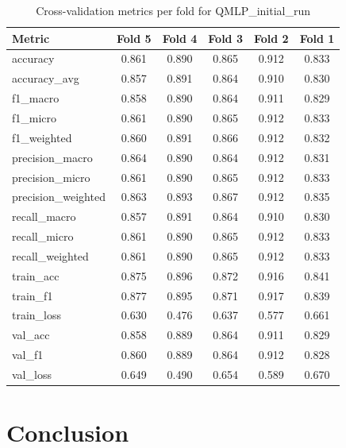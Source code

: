 \documentclass[runningheads]{llncs}
\begin{document}
\begin{table}[t]
\centering
\caption{Cross-validation metrics per fold for QMLP\_initial\_run}\label{tab3}
\begin{tabular}{|l|c|c|c|c|c|}
\hline
Metric & Fold 5 & Fold 4 & Fold 3 & Fold 2 & Fold 1 \\
\hline
accuracy & 0.861 & 0.890 & 0.865 & 0.912 & 0.833 \\
accuracy\_avg & 0.857 & 0.891 & 0.864 & 0.910 & 0.830 \\
f1\_macro & 0.858 & 0.890 & 0.864 & 0.911 & 0.829 \\
f1\_micro & 0.861 & 0.890 & 0.865 & 0.912 & 0.833 \\
f1\_weighted & 0.860 & 0.891 & 0.866 & 0.912 & 0.832 \\
precision\_macro & 0.864 & 0.890 & 0.864 & 0.912 & 0.831 \\
precision\_micro & 0.861 & 0.890 & 0.865 & 0.912 & 0.833 \\
precision\_weighted & 0.863 & 0.893 & 0.867 & 0.912 & 0.835 \\
recall\_macro & 0.857 & 0.891 & 0.864 & 0.910 & 0.830 \\
recall\_micro & 0.861 & 0.890 & 0.865 & 0.912 & 0.833 \\
recall\_weighted & 0.861 & 0.890 & 0.865 & 0.912 & 0.833 \\
train\_acc & 0.875 & 0.896 & 0.872 & 0.916 & 0.841 \\
train\_f1 & 0.877 & 0.895 & 0.871 & 0.917 & 0.839 \\
train\_loss & 0.630 & 0.476 & 0.637 & 0.577 & 0.661 \\
val\_acc & 0.858 & 0.889 & 0.864 & 0.911 & 0.829 \\
val\_f1 & 0.860 & 0.889 & 0.864 & 0.912 & 0.828 \\
val\_loss & 0.649 & 0.490 & 0.654 & 0.589 & 0.670 \\
\hline
\end{tabular}
\end{table}



\section{Conclusion}
\end{document}
